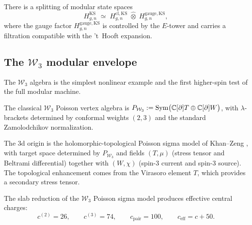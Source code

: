 \begin{conjecture}
There is a splitting of modular state spaces
\begin{equation}
H_{g,n}^{\mathrm{KS}}
\;\simeq\;
H_{g,n}^{\mathrm{cl,KS}}
\;\hat\otimes\;
H_{g,n}^{\mathrm{gauge,KS}},
\end{equation}
where the gauge factor $H_{g,n}^{\mathrm{gauge,KS}}$ is controlled by the $E$-tower
and carries a filtration compatible with the 't~Hooft expansion.
\end{conjecture}

\subsection{The \texorpdfstring{$\mathcal{W}_3$}{W3} modular envelope}

The $\mathcal{W}_3$ algebra is the simplest nonlinear example and the first
higher-spin test of the full modular machine.

\begin{definition}
The classical $\mathcal{W}_3$ Poisson vertex algebra is
$P_{\mathcal{W}_3} := \operatorname{Sym}\bigl(\mathbb C[\partial]T \oplus \mathbb C[\partial]W\bigr)$,
with $\lambda$-brackets determined by conformal weights $(2,3)$ and the standard
Zamolodchikov normalization.
\end{definition}

The 3d origin is the holomorphic-topological Poisson sigma model of Khan--Zeng
\cite{KZ25}, with target space determined by $P_{\mathcal{W}_3}$ and fields
$(T,\mu)$ (stress tensor and Beltrami differential) together with $(W,\chi)$
(spin-3 current and spin-3 source). The topological enhancement comes from the
Virasoro element $T$, which provides a secondary stress tensor.

\begin{conjecture}
The slab reduction of the $\mathcal{W}_3$ Poisson sigma model produces effective
central charges:
\[
c^{(2)} = 26,
\qquad
c^{(3)} = 74,
\qquad
c_{\mathrm{pair}} = 100,
\qquad
c_{\mathrm{eff}} = c + 50.
\]
\end{conjecture}


